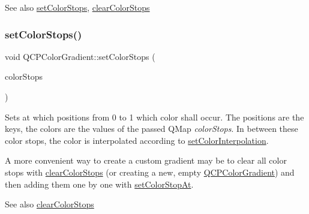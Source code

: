 \begin{DoxySeeAlso}{See also}
\hyperlink{class_q_c_p_color_gradient_a724e828aa6f0ba5011a9392477c35d3a}{set\+Color\+Stops}, \hyperlink{class_q_c_p_color_gradient_a939213e85f0d1279519d555c5fcfb6ad}{clear\+Color\+Stops} 
\end{DoxySeeAlso}
\mbox{\label{class_q_c_p_color_gradient_a724e828aa6f0ba5011a9392477c35d3a}} 
\subsubsection{\texorpdfstring{set\+Color\+Stops()}{setColorStops()}}
{\footnotesize\ttfamily void Q\+C\+P\+Color\+Gradient\+::set\+Color\+Stops (\begin{DoxyParamCaption}\item[{const Q\+Map$<$ double, Q\+Color $>$ \&}]{color\+Stops }\end{DoxyParamCaption})}

Sets at which positions from 0 to 1 which color shall occur. The positions are the keys, the colors are the values of the passed Q\+Map {\itshape color\+Stops}. In between these color stops, the color is interpolated according to \hyperlink{class_q_c_p_color_gradient_aa13fda86406e1d896a465a409ae63b38}{set\+Color\+Interpolation}.

A more convenient way to create a custom gradient may be to clear all color stops with \hyperlink{class_q_c_p_color_gradient_a939213e85f0d1279519d555c5fcfb6ad}{clear\+Color\+Stops} (or creating a new, empty \hyperlink{class_q_c_p_color_gradient}{Q\+C\+P\+Color\+Gradient}) and then adding them one by one with \hyperlink{class_q_c_p_color_gradient_a3b48be5e78079db1bb2a1188a4c3390e}{set\+Color\+Stop\+At}.

\begin{DoxySeeAlso}{See also}
\hyperlink{class_q_c_p_color_gradient_a939213e85f0d1279519d555c5fcfb6ad}{clear\+Color\+Stops} 
\end{DoxySeeAlso}
\mbox{\label{class_q_c_p_color_gradient_a18da587eb4f7fc788ea28ba15b6a12de}} 
